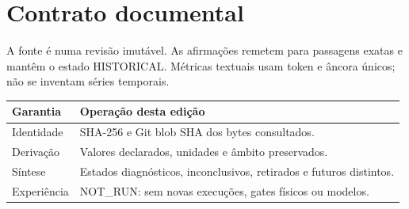 \section{Contrato documental}
A fonte é  numa revisão imutável. As afirmações remetem para passagens exatas e mantêm o estado HISTORICAL. Métricas textuais usam token e âncora únicos; não se inventam séries temporais.

\begin{tabularx}{\linewidth}{@{}p{37mm}Y@{}}
\toprule \textbf{Garantia} & \textbf{Operação desta edição}\\ \midrule
Identidade & SHA-256 e Git blob SHA dos bytes consultados.\\
Derivação & Valores declarados, unidades e âmbito preservados.\\
Síntese & Estados diagnósticos, inconclusivos, retirados e futuros distintos.\\
Experiência & NOT\_RUN: sem novas execuções, gates físicos ou modelos.\\
\bottomrule
\end{tabularx}
